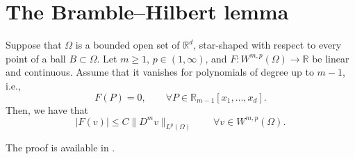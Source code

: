 



\section{The Bramble--Hilbert lemma}

\begin{lemma}
    \label{lem:Bramble-Hilbert}
    Suppose that $\Omega$ is a bounded open set of $\mathbb R^d$, star-shaped with respect to every point of a ball $B \subset \Omega$.
    Let $m \ge 1$, $p \in (1,\infty)$, and $F: W^{m,p} (\Omega) \to \mathbb R$ be linear and continuous. Assume that it vanishes for polynomials of degree up to $m-1$, i.e.,
    \begin{equation*}
        F(P) = 0, \qquad \forall P \in \mathbb R_{m-1}[x_1, \dots, x_d].
    \end{equation*}
    Then, we have that
    \begin{equation*}
        |F(v)| \le C \|D^m v\|_{L^p (\Omega)} \qquad \forall v \in W^{m,p}(\Omega).
    \end{equation*}
\end{lemma}
The proof is available in \cite[Lemma 12]{Suli}.

\printbibliography[heading=subbibliography]
